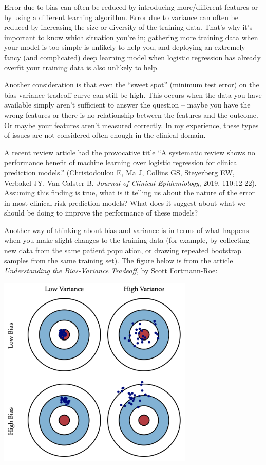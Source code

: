Error due to bias can often be reduced by introducing more/different features or by using a different learning algorithm. Error due to variance can often be reduced by increasing the size or diversity of the training data. That's why it's important to know which situation you're in; gathering more training data when your model is too simple is unlikely to help you, and deploying an extremely fancy (and complicated) deep learning model when logistic regression has already overfit your training data is also unlikely to help. 

Another consideration is that even the ``sweet spot'' (minimum test error) on the bias-variance tradeoff curve can still be high. This occurs when the data you have available simply aren't sufficient to answer the question -- maybe you have the wrong features or there is no relationship between the features and the outcome. Or maybe your features aren't measured correctly. In my experience, these types of issues are not considered often enough in the clinical domain. 

\vspace{2mm}

\begin{question}{}
A recent review article had the provocative title ``A systematic review shows no performance benefit of machine learning over logistic regression for clinical prediction models.'' (Christodoulou E, Ma J, Collins GS, Steyerberg EW, Verbakel JY, Van Calster B. \emph{Journal of Clinical Epidemiology}, 2019, 110:12-22). Assuming this finding is true, what is it telling us about the nature of the error in most clinical risk prediction models? What does it suggest about what we should be doing to improve the performance of these models? 
\end{question}

Another way of thinking about bias and variance is in terms of what happens when you make slight changes to the training data (for example, by collecting new data from the same patient population, or drawing repeated bootstrap samples from the same training set). The figure below is from the article \emph{Understanding the Bias-Variance Tradeoff}, by Scott Fortmann-Roe:

\begin{center}
\includegraphics[width=0.7\textwidth]{img/targets-bias-variance.png}
\end{center}

